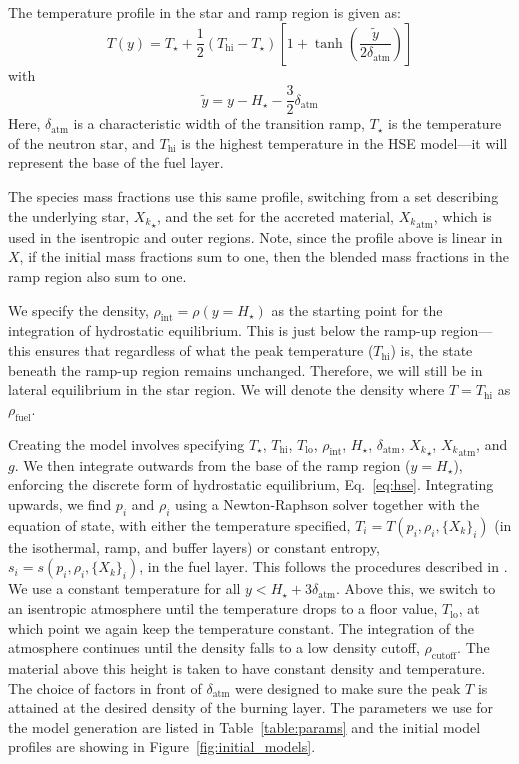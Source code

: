 \documentclass[preprint,times,tighten]{aastex63}
\begin{document}
The temperature profile in the star and ramp region is given as:
\begin{equation}
T(y) = T_\star + \frac{1}{2} (T_\mathrm{hi} - T_\star) \left [ 1 + \tanh\left( \frac{\tilde{y}}{2 \delta_\mathrm{atm}} \right ) \right ]
\end{equation}
with
\begin{equation}
\tilde{y} = y - H_\star - \frac{3}{2} \delta_\mathrm{atm}
\end{equation}
Here, $\delta_\mathrm{atm}$ is a characteristic width of the
transition ramp, $T_\star$ is the temperature of the neutron star, and
$T_\mathrm{hi}$ is the highest temperature in the HSE model---it will
represent the base of the fuel layer.

The species mass fractions use this same profile, switching from a set
describing the underlying star, ${X_k}_\star$, and the set for the
accreted material, ${X_k}_\mathrm{atm}$, which is used in the
isentropic and outer regions.  Note, since the profile above is
linear in $X$, if the initial mass fractions sum to one, then the blended
mass fractions in the ramp region also sum to one.

We specify the density, $\rho_\mathrm{int} = \rho(y = H_\star)$ as the
starting point for the integration of hydrostatic equilibrium.  This
is just below the ramp-up region---this ensures that regardless of
what the peak temperature ($T_\mathrm{hi}$) is, the state beneath the
ramp-up region remains unchanged.  Therefore, we will still be in
lateral equilibrium in the star region.  We will denote the density
where $T = T_\mathrm{hi}$ as $\rho_\mathrm{fuel}$.


Creating the model involves specifying $T_\star$, $T_\mathrm{hi}$,
$T_\mathrm{lo}$, $\rho_\mathrm{int}$, $H_\star$,
$\delta_\mathrm{atm}$, ${X_k}_\star$, ${X_k}_\mathrm{atm}$, and $g$.  We
then integrate outwards from the base of the ramp region ($y =
H_\star$), enforcing the discrete form of hydrostatic equilibrium,
Eq.~\ref{eq:hse}.  Integrating upwards, we find $p_i$ and
$\rho_i$ using a Newton-Raphson solver together with the equation of state, with either the temperature
specified, $T_i = T(p_i, \rho_i, \{X_k\}_i)$ (in the isothermal, ramp,
and buffer layers) or constant entropy, $s_i = s(p_i, \rho_i,
\{X_k\}_i)$, in the fuel layer.  This follows the procedures described in \citet{ppm-hse}.  We
use a constant temperature for all $y < H_\star +
3\delta_\mathrm{atm}$.  Above this, we switch to an isentropic atmosphere until the
temperature drops to a floor value, $T_\mathrm{lo}$, at which point we
again keep the temperature constant.  The integration of the
atmosphere continues until the density falls to a low density cutoff,
$\rho_\mathrm{cutoff}$.  The material above this height is taken to
have constant density and temperature.
The choice of factors in front of $\delta_\mathrm{atm}$ were designed
to make sure the peak $T$ is attained at the desired density
of the burning layer.
The parameters we use for
the model generation are listed in Table~\ref{table:params} and the 
initial model profiles are showing in Figure~\ref{fig:initial_models}.
\end{document}
